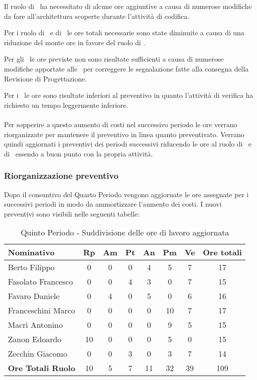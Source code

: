 \documentclass[../PianoDiProgetto_v4.0.0.tex]{subfiles}
\begin{document}
			Il ruolo di \progettista\ ha necessitato di alcune ore aggiuntive a causa di numerose modifiche da fare all'architettura scoperte durante l'attività di codifica. 
			
			Per i ruolo di \responsabilediprogetto\ e di \programmatore\ le ore totali necessarie sono state diminuite a causa di una riduzione del monte ore in favore del ruolo di \progettista.
			
			Per gli \amministratori\ le ore previste non sono risultate sufficienti a causa di numerose modifiche apportate alle \normediprogettoRQ\ per correggere le segnalazione fatte alla consegna della Revisione di Progettazione.
			
			Per i \verificatori\ le ore sono risultate inferiori al preventivo in quanto l'attività di verifica ha richiesto un tempo leggermente inferiore.
			\\ \\
			Per sopperire a questo aumento di costi nel successivo periodo le ore verrano riorganizzate per mantenere il preventivo in linea quanto preventivato. Verrano quindi aggiornati i preventivi dei periodi successivi riducendo le ore al ruolo di \progettista\ e di \analista\ essendo a buon punto con la propria attività.\\
			
		\subsubsection{Riorganizzazione preventivo}
		Dopo il consuntivo del Quarto Periodo vengono aggiornate le ore assegnate per i successivi periodi in modo da ammortizzare l'aumento dei costi. I nuovi preventivi sono visibili nelle seguenti tabelle:
		
		\begin{table}[h]
			\begin{tabularx}{\textwidth}{l * {6}{C} c}
			\toprule
			\textbf{Nominativo} & \textbf{Rp} & \textbf{Am} & \textbf{Pt} & \textbf{An} & \textbf{Pm} & \textbf{Ve} & \textbf{Ore totali} \\
			\midrule
			Berto Filippo &	0 & 0 & 0 & 4 & 5 & 7 & 17 \\
			Fasolato Francesco & 0 & 0 & 4 & 3 & 0 & 7 & 15 \\
			Favaro Daniele & 0 & 4 & 0 & 5 & 0 & 6 & 16 \\
			Franceschini Marco & 0 & 0 & 0 & 0 & 10 & 7 & 17 \\
			Macrì Antonino & 0 & 0 & 0 & 0 & 9 & 5 & 15 \\
			Zanon Edoardo &	10 & 0 & 0 & 0 & 5 & 0 & 15 \\
			Zecchin Giacomo & 0 & 0 & 3 & 0 & 3 & 7 & 14 \\
			\midrule		
			\textbf{Ore Totali Ruolo} & 10 & 5 & 7 & 11 & 32 & 39 & 109 \\
			\bottomrule
			\end{tabularx}
			\caption{Quinto Periodo - Suddivisione delle ore di lavoro aggiornata}		
		\end{table}
		
\end{document}
